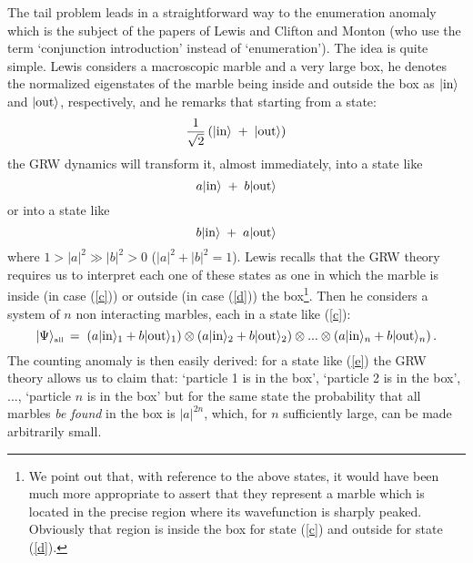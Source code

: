 \documentclass[12pt]{article}
\begin{document}
The tail problem leads in a straightforward way to the enumeration
anomaly which is the subject of the papers of Lewis \cite{lew} and
Clifton and Monton \cite{cli1,cli2} (who use the term `conjunction
introduction' instead of  `enumeration'). The idea is quite
simple. Lewis considers a macroscopic marble and a very large box,
he denotes the normalized eigenstates of the marble being inside
and outside the box as $|\makebox{in}\rangle$ and
$|\makebox{out}\rangle$, respectively, and he remarks that
starting from a state:
\begin{equation} \label{b}
\frac{1}{\sqrt{2}}\left( |\makebox{in}\rangle\; + \;
|\makebox{out}\rangle \right)
\end{equation}
the GRW dynamics will transform it, almost immediately, into a
state like
\begin{equation} \label{c}
a|\makebox{in}\rangle \; + \; b|\makebox{out}\rangle
\end{equation}
or into a state like
\begin{equation} \label{d}
b|\makebox{in}\rangle \; + \; a|\makebox{out}\rangle
\end{equation}
where $1> |a|^{2} \gg |b|^{2} > 0$ ($|a|^{2} + |b|^{2} = 1$).
Lewis recalls that the GRW theory requires us to interpret each
one of these states as one in which the marble is inside (in case
(\ref{c})) or outside (in case (\ref{d})) the box\footnote{We
point out that, with reference to the above states, it would have
been much more appropriate to assert that they represent a marble
which is located in the precise region where its wavefunction is
sharply peaked. Obviously that region is inside the box for state
(\ref{c}) and outside for state (\ref{d}).}. Then he considers a
system of $n$ non interacting marbles, each in a state like
(\ref{c}):
\begin{equation} \label{e}
|\Psi\rangle_{{\makebox{\tiny all}}} \, = \; \left(
a|\makebox{in}\rangle_{1} + b|\makebox{out}\rangle_{1}\right)
\otimes \left( a|\makebox{in}\rangle_{2} +
b|\makebox{out}\rangle_{2}\right) \otimes ...\otimes \left(
a|\makebox{in}\rangle_{n} + b|\makebox{out}\rangle_{n}\right).
\end{equation}
The counting anomaly is then easily derived: for a state like
(\ref{e}) the GRW theory allows us to claim that: `particle 1 is
in the box', `particle 2 is in the box', ..., `particle $n$ is in
the box' but for the same state the probability that all marbles
{\it be found} in the box is $|a|^{2n}$, which, for $n$
sufficiently large, can be made arbitrarily small.
\end{document}
